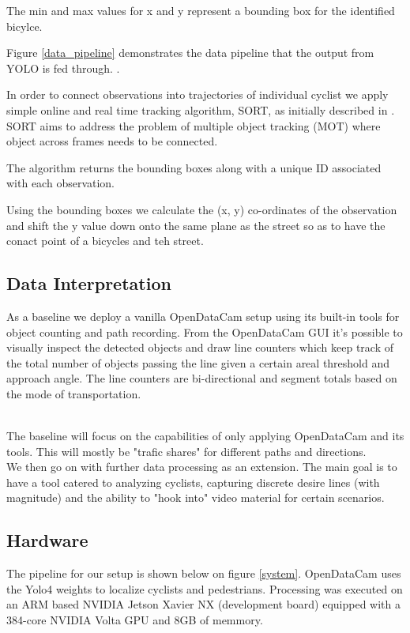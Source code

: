 \documentclass[
10pt, %
a4paper, %
oneside, %
headinclude,footinclude, %
] {book}%
\begin{document}
The min and max values for x and y represent a bounding box for the identified bicylce.

Figure \ref{data_pipeline} demonstrates the data pipeline that the output from YOLO is fed through. .

In order to connect observations into trajectories of individual cyclist we apply 
simple online and real time tracking algorithm, SORT, as initially described in \cite{Bewley2016_sort}. 
SORT aims to address the problem of multiple object tracking (MOT) where object across frames needs to be connected. 

The algorithm returns the bounding boxes along with a unique ID associated with each observation.

Using the bounding boxes we calculate the (x, y) co-ordinates of the observation and shift the y value down onto 
the same plane as the street so as to have the conact point of a bicycles and teh street.




\subsection{Data Interpretation}
As a baseline we deploy a vanilla OpenDataCam setup using its built-in tools for object counting and path recording.
From the OpenDataCam GUI it's possible to visually inspect the detected objects and draw line counters 
which keep track of the total number of objects passing the line given a certain areal threshold and approach angle. 
The line counters are bi-directional and segment totals based on the mode of transportation.

\ \\
The baseline will focus on the capabilities of only applying OpenDataCam and its tools. This will mostly be "trafic shares" for 
different paths and directions. 
\\ 
We then go on with further data processing as an extension. The main goal is to have a tool catered to analyzing cyclists, capturing
discrete desire lines (with magnitude) and the ability to "hook into" video material for certain scenarios.

\subsection{Hardware}
The pipeline for our setup is shown below on figure \ref{system}. OpenDataCam uses the Yolo4 weights to localize cyclists and pedestrians.
Processing was executed on an ARM based NVIDIA Jetson Xavier NX (development board) equipped with a 384-core NVIDIA Volta GPU
and 8GB of memmory. 
\end{document}
